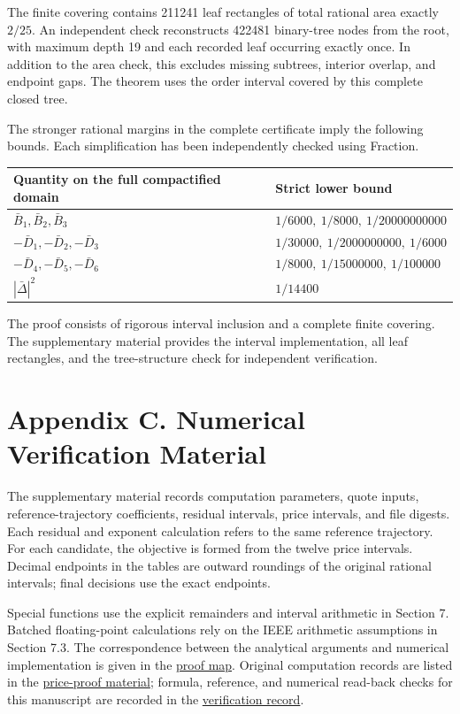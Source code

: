 \documentclass[a4paper,11pt]{article}
\begin{document}
The finite covering contains 211241 leaf rectangles of total rational area exactly \(2/25\). An independent check reconstructs 422481 binary-tree nodes from the root, with maximum depth 19 and each recorded leaf occurring exactly once. In addition to the area check, this excludes missing subtrees, interior overlap, and endpoint gaps. The theorem uses the order interval covered by this complete closed tree.

The stronger rational margins in the complete certificate imply the following bounds. Each simplification has been independently checked using Fraction.

\begingroup\scriptsize\setlength{\tabcolsep}{3pt}
\begin{longtable}{L{0.445000\textwidth}L{0.445000\textwidth}}
Quantity on the full compactified domain & Strict lower bound\\
\hline
\(\bar B_1,\bar B_2,\bar B_3\) & \(1/6000,\ 1/8000,\ 1/20000000000\)\\
\(-\bar D_1,-\bar D_2,-\bar D_3\) & \(1/30000,\ 1/2000000000,\ 1/6000\)\\
\(-\bar D_4,-\bar D_5,-\bar D_6\) & \(1/8000,\ 1/15000000,\ 1/100000\)\\
\(|\bar\Delta|^2\) & \(1/14400\)\\
\end{longtable}\endgroup

The proof consists of rigorous interval inclusion and a complete finite covering. The supplementary material provides the interval implementation, all leaf rectangles, and the tree-structure check for independent verification.

\section*{Appendix C. Numerical Verification Material}

The supplementary material records computation parameters, quote inputs, reference-trajectory coefficients, residual intervals, price intervals, and file digests. Each residual and exponent calculation refers to the same reference trajectory. For each candidate, the objective is formed from the twelve price intervals. Decimal endpoints in the tables are outward roundings of the original rational intervals; final decisions use the exact endpoints.

Special functions use the explicit remainders and interval arithmetic in Section 7. Batched floating-point calculations rely on the IEEE arithmetic assumptions in Section 7.3. The correspondence between the analytical arguments and numerical implementation is given in the \href{../docs/proof-map.md}{proof map}. Original computation records are listed in the \href{../docs/proof-map.md}{price-proof material}; formula, reference, and numerical read-back checks for this manuscript are recorded in the \href{../docs/release-verification.json}{verification record}.
\end{document}
